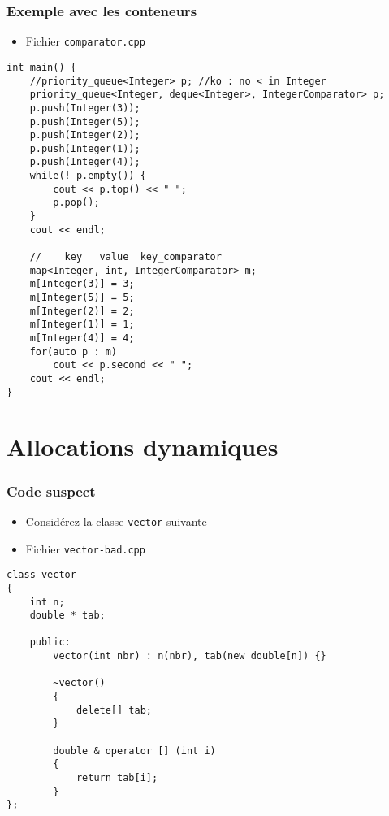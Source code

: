 \begin{frame}[containsverbatim]
\frametitle{Exemple avec les conteneurs}
\begin{itemize}
\item Fichier \texttt{comparator.cpp}
\end{itemize}
\begin{lstlisting}
int main() {
    //priority_queue<Integer> p; //ko : no < in Integer        
    priority_queue<Integer, deque<Integer>, IntegerComparator> p;
    p.push(Integer(3));
    p.push(Integer(5));
    p.push(Integer(2));
    p.push(Integer(1));
    p.push(Integer(4));
    while(! p.empty()) {
        cout << p.top() << " ";
        p.pop();
    }
    cout << endl;
    
    //    key   value  key_comparator
    map<Integer, int, IntegerComparator> m;    
    m[Integer(3)] = 3;
    m[Integer(5)] = 5;
    m[Integer(2)] = 2;
    m[Integer(1)] = 1;
    m[Integer(4)] = 4;
    for(auto p : m)
        cout << p.second << " ";
    cout << endl;
}
\end{lstlisting}
\end{frame}

\section[Alloc. dyn.]{Allocations dynamiques}

\begin{frame}[containsverbatim]
\frametitle{Code suspect}
\begin{itemize}
\item Considérez la classe \texttt{vector} suivante
\item Fichier \texttt{vector-bad.cpp}
\end{itemize}
\begin{lstlisting}
class vector
{
	int n;
	double * tab;
	
	public:
		vector(int nbr) : n(nbr), tab(new double[n]) {}
		
		~vector()
		{
			delete[] tab;
		}			

		double & operator [] (int i)
		{
			return tab[i];
		}		
};
\end{lstlisting}
\end{frame}

